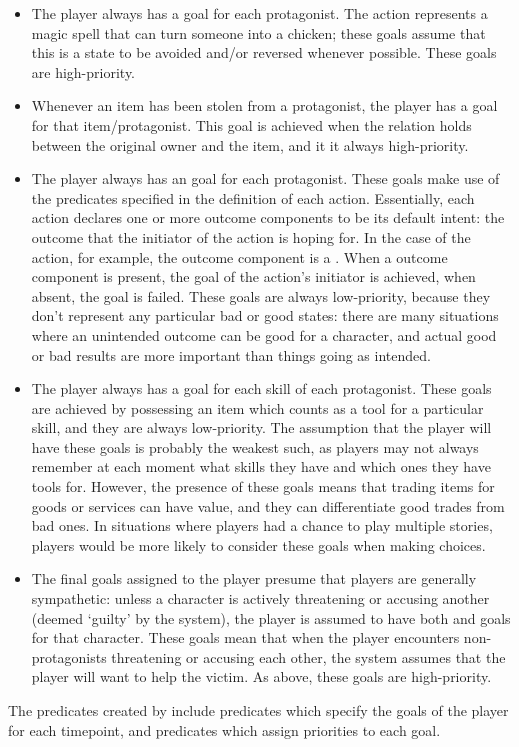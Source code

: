 \begin{enumerate}[leftmargin=1.4em]
\begin{itemize}
\item The player always has a  goal for each protagonist. The  action represents a magic spell that can turn someone into a chicken; these goals assume that this is a state to be avoided and/or reversed whenever possible. These goals are high-priority.
\item Whenever an item has been stolen from a protagonist, the player has a  goal for that item/protagonist. This goal is achieved when the  relation holds between the original owner and the item, and it it always high-priority.
\item The player always has an  goal for each protagonist. These goals make use of the  predicates specified in the definition of each action. Essentially, each action declares one or more outcome components to be its default intent: the outcome that the initiator of the action is hoping for. In the case of the  action, for example, the outcome component  is a . When a  outcome component is present, the  goal of the action's initiator is achieved, when absent, the goal is failed. These goals are always low-priority, because they don't represent any particular bad or good states: there are many situations where an unintended outcome can be good for a character, and actual good or bad results are more important than things going as intended.
\item The player always has a  goal for each skill of each protagonist. These goals are achieved by possessing an item which counts as a tool for a particular skill, and they are always low-priority. The assumption that the player will have these goals is probably the weakest such, as players may not always remember at each moment what skills they have and which ones they have tools for. However, the presence of these goals means that trading items for goods or services can have value, and they can differentiate good trades from bad ones. In situations where players had a chance to play multiple stories, players would be more likely to consider these goals when making choices.
\item The final goals assigned to the player presume that players are generally sympathetic: unless a character is actively threatening or accusing another (deemed `guilty' by the system), the player is assumed to have both  and  goals for that character. These goals mean that when the player encounters non-protagonists threatening or accusing each other, the system assumes that the player will want to help the victim. As above, these goals are high-priority.
\end{itemize}
%
The predicates created by  include  predicates which specify the goals of the player for each timepoint, and  predicates which assign priorities to each goal.



\end{enumerate}
